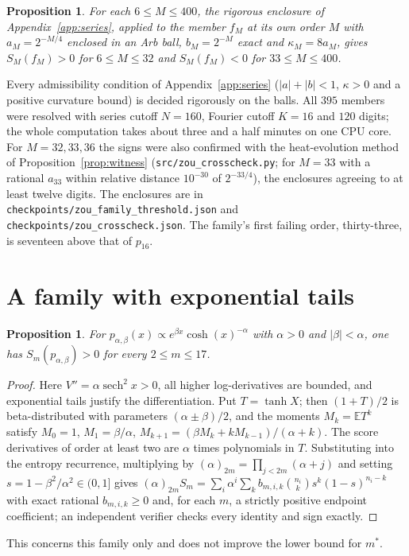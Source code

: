 \documentclass[11pt]{article}
\newtheorem{proposition}[theorem]{Proposition}
\theoremstyle{definition}
\theoremstyle{remark}
\newcommand{\E}{\mathbb E}
\begin{document}
\begin{proposition}\label{prop:zou}
For each $6\le M\le400$, the rigorous enclosure of Appendix~\ref{app:series}, applied
to the member $f_M$ at its own order $M$ with $a_M=2^{-M/4}$ enclosed in an Arb ball,
$b_M=2^{-M}$ exact and $\kappa_M=8a_M$, gives $S_M(f_M)>0$ for $6\le M\le32$ and
$S_M(f_M)<0$ for $33\le M\le400$.
\end{proposition}
Every admissibility condition of Appendix~\ref{app:series} ($|a|+|b|<1$, $\kappa>0$
and a positive curvature bound) is decided rigorously on the balls. All $395$ members
were resolved with series cutoff $N=160$, Fourier cutoff $K=16$ and $120$ digits; the
whole computation takes about three and a half minutes on one CPU core. For $M=32,33,36$
the signs were also confirmed with the heat-evolution method of
Proposition~\ref{prop:witness} (\texttt{src/zou\_crosscheck.py}; for $M=33$ with a
rational $a_{33}$ within relative distance $10^{-30}$ of $2^{-33/4}$), the enclosures
agreeing to at least twelve digits. The enclosures are in
\texttt{checkpoints/zou\_family\_threshold.json} and
\texttt{checkpoints/zou\_crosscheck.json}. The family's first failing order,
thirty-three, is seventeen above that of $p_{16}$.

\section{A family with exponential tails}\label{sec:logcosh}
\begin{proposition}
For $p_{\alpha,\beta}(x)\propto e^{\beta x}\cosh(x)^{-\alpha}$ with $\alpha>0$ and
$|\beta|<\alpha$, one has $S_m(p_{\alpha,\beta})>0$ for every $2\le m\le17$.
\end{proposition}
\begin{proof}
Here $V''=\alpha\operatorname{sech}^2x>0$, all higher log-derivatives are bounded, and
exponential tails justify the differentiation. Put $T=\tanh X$; then $(1+T)/2$ is
beta-distributed with parameters $(\alpha\pm\beta)/2$, and the moments $M_k=\E T^k$
satisfy $M_0=1$, $M_1=\beta/\alpha$, $M_{k+1}=(\beta M_k+kM_{k-1})/(\alpha+k)$. The
score derivatives of order at least two are $\alpha$ times polynomials in $T$.
Substituting into the entropy recurrence, multiplying by
$(\alpha)_{2m}=\prod_{j<2m}(\alpha+j)$ and setting $s=1-\beta^2/\alpha^2\in(0,1]$
gives $(\alpha)_{2m}S_m=\sum_i\alpha^i\sum_kb_{m,i,k}\binom{n_i}ks^k(1-s)^{n_i-k}$
with exact rational $b_{m,i,k}\ge0$ and, for each $m$, a strictly positive endpoint
coefficient; an independent verifier checks every identity and sign exactly.
\end{proof}
This concerns this family only and does not improve the lower bound for $m^*$.
\end{document}
